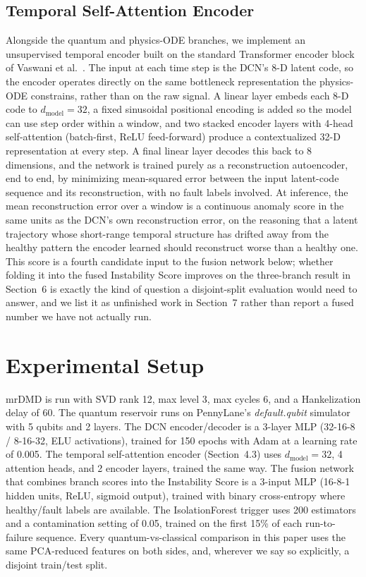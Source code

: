 \documentclass[3p,times,procedia]{elsarticle}
\begin{document}
\subsection{Temporal Self-Attention Encoder}

Alongside the quantum and physics-ODE branches, we implement an unsupervised temporal encoder built on the standard Transformer encoder block of Vaswani et al.\ \cite{vaswani2017}. The input at each time step is the DCN's 8-D latent code, so the encoder operates directly on the same bottleneck representation the physics-ODE constrains, rather than on the raw signal. A linear layer embeds each 8-D code to $d_{\mathrm{model}} = 32$, a fixed sinusoidal positional encoding is added so the model can use step order within a window, and two stacked encoder layers with 4-head self-attention (batch-first, ReLU feed-forward) produce a contextualized 32-D representation at every step. A final linear layer decodes this back to 8 dimensions, and the network is trained purely as a reconstruction autoencoder, end to end, by minimizing mean-squared error between the input latent-code sequence and its reconstruction, with no fault labels involved. At inference, the mean reconstruction error over a window is a continuous anomaly score in the same units as the DCN's own reconstruction error, on the reasoning that a latent trajectory whose short-range temporal structure has drifted away from the healthy pattern the encoder learned should reconstruct worse than a healthy one. This score is a fourth candidate input to the fusion network below; whether folding it into the fused Instability Score improves on the three-branch result in Section~6 is exactly the kind of question a disjoint-split evaluation would need to answer, and we list it as unfinished work in Section~7 rather than report a fused number we have not actually run.

\section{Experimental Setup}

mrDMD is run with SVD rank 12, max level 3, max cycles 6, and a Hankelization delay of 60. The quantum reservoir runs on PennyLane's \textit{default.qubit} simulator with 5 qubits and 2 layers. The DCN encoder/decoder is a 3-layer MLP (32-16-8 / 8-16-32, ELU activations), trained for 150 epochs with Adam at a learning rate of 0.005. The temporal self-attention encoder (Section~4.3) uses $d_{\mathrm{model}} = 32$, 4 attention heads, and 2 encoder layers, trained the same way. The fusion network that combines branch scores into the Instability Score is a 3-input MLP (16-8-1 hidden units, ReLU, sigmoid output), trained with binary cross-entropy where healthy/fault labels are available. The IsolationForest trigger uses 200 estimators and a contamination setting of 0.05, trained on the first 15\% of each run-to-failure sequence. Every quantum-vs-classical comparison in this paper uses the same PCA-reduced features on both sides, and, wherever we say so explicitly, a disjoint train/test split.
\end{document}
